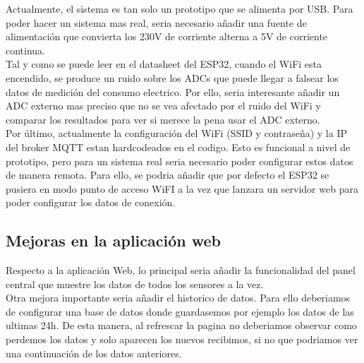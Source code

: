 \begin{titlepage}
Actualmente, el sistema es tan solo un prototipo que se alimenta por USB. Para poder hacer un sistema mas real, seria necesario añadir una fuente de alimentación\cite{ref24} que convierta los 230V de corriente alterna a 5V de corriente continua.\\

Tal y como se puede leer en el datasheet del ESP32, cuando el WiFi esta encendido, se produce un ruido sobre los ADCs que puede llegar a falsear los datos de medición del consumo electrico. Por ello, seria interesante añadir un ADC externo mas preciso que no se vea afectado por el ruido del WiFi y comparar los resultados para ver si merece la pena usar el ADC externo. \\

Por último, actualmente la configuración del WiFi (SSID y contraseña) y la IP del broker MQTT estan hardcodeados en el codigo. Esto es funcional a nivel de prototipo, pero para un sistema real seria necesario poder configurar estos datos de manera remota. Para ello, se podria añadir que por defecto el ESP32 se pusiera en modo punto de acceso WiFI a la vez que lanzara un servidor web para poder configurar los datos de conexión. \\
\subsection{Mejoras en la aplicación web}
Respecto a la aplicación Web, lo principal seria añadir la funcionalidad del panel central que muestre los datos de todos los sensores a la vez. \\
Otra mejora importante seria añadir el historico de datos. Para ello deberiamos de configurar una base de datos donde guardasemos por ejemplo los datos de las ultimas 24h. De esta manera, al refrescar la pagina no deberiamos observar como perdemos los datos y solo aparecen los nuevos recibimos, si no que podriamos ver una continuación de los datos anteriores. \\

\end{titlepage}

